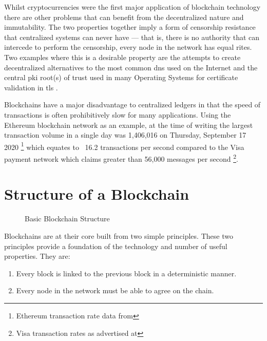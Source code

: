 Whilst cryptocurrencies were the first major application of blockchain technology there are other problems  that can benefit from the decentralized nature and immutability. The two properties together imply a form of censorship resistance that centralized systems can never have --- that is, there is no authority that can intercede to perform the censorship, every node in the network has equal rites. Two examples where this is a desirable property are  the attempts to create decentralized alternatives to the most common \gls{dns} used on the Internet \cite{Namecoin,ENSEthereumName,UnstoppableDomainsDocumentation} and the central \gls{pki} root(s) of trust used in many Operating Systems for certificate validation in \gls{tls} \cite{yakubovBlockchainbasedPKIManagement2018,kubilayCertLedgerNewPKI2019,matsumotoIKPTurningPKI2016}.

Blockchains have a major disadvantage to centralized ledgers in that the speed of transactions is often prohibitively slow for many applications. Using the Ethereum blockchain network as an example, at the time of writing the largest transaction volume in a single day was 1,406,016 on Thursday, September 17 2020 \footnote{Ethereum transaction rate data from } which equates to ~16.2 transactions per second compared to the Visa payment network which claims greater than 56,000 messages per second \footnote{Visa transaction rates as advertised at }.


\section{Structure of a Blockchain}
\label{ch:blockchain:structure}

\begin{figure}[h]
    \centering
    
    \caption{Basic Blockchain Structure}
    \label{fig:basic-blockchain}
\end{figure}


Blockchains are at their core built from two simple principles. These two principles provide a foundation of the technology and number of useful properties. They are:

\begin{enumerate}
    \item Every block is linked to the previous block in a deterministic manner.
    \item Every node in the network must be able to agree on the chain.
\end{enumerate}

